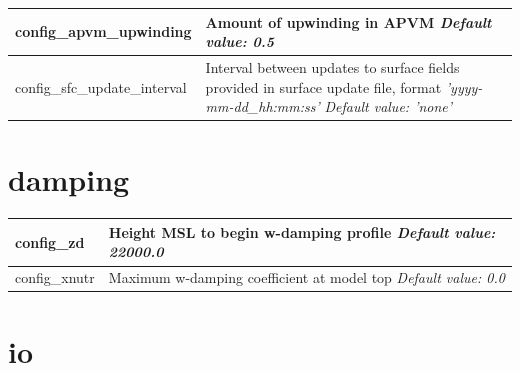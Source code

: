 \documentclass[11pt]{report}
\begin{document}
{\begin{longtable}{|p{1.75in} |p{4.5in}|}
   config\_apvm\_upwinding & Amount of upwinding in APVM \newline 
   {\em Default value: 0.5} \\ \hline   

   config\_sfc\_update\_interval & Interval between updates to surface fields provided in surface update file, 
   format {\em 'yyyy-mm-dd\_hh:mm:ss'} \newline 
   {\em Default value: 'none'} \\ \hline

\end{longtable}
}

\section{damping}

{\small
\begin{longtable}{|p{2.0in} |p{4.25in}|}
 \hline
   config\_zd & Height MSL to begin w-damping profile \newline 
   {\em Default value: 22000.0} \\ \hline

   config\_xnutr & Maximum w-damping coefficient at model top \newline 
   {\em Default value: 0.0} \\ \hline
\end{longtable}
}

\section{io}
\end{document}
